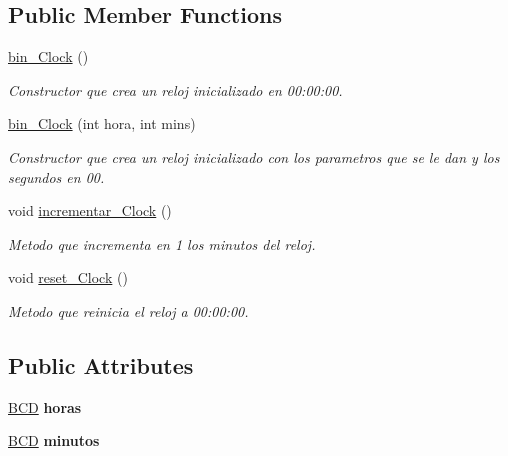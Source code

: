 \subsection*{Public Member Functions}
\begin{DoxyCompactItemize}
\item 
\mbox{\label{classbin__Clock_af4bb98f6018065cfda88fbc00d7c4c9c}} 
\hyperlink{classbin__Clock_af4bb98f6018065cfda88fbc00d7c4c9c}{bin\+\_\+\+Clock} ()
\begin{DoxyCompactList}\small\item\em Constructor que crea un reloj inicializado en 00\+:00\+:00. \end{DoxyCompactList}\item 
\hyperlink{classbin__Clock_a08180ca924ba3cf39b87fad8faafc5cc}{bin\+\_\+\+Clock} (int hora, int mins)
\begin{DoxyCompactList}\small\item\em Constructor que crea un reloj inicializado con los parametros que se le dan y los segundos en 00. \end{DoxyCompactList}\item 
\mbox{\label{classbin__Clock_a3a6acf30477a05b6bb743d5b2317100b}} 
void \hyperlink{classbin__Clock_a3a6acf30477a05b6bb743d5b2317100b}{incrementar\+\_\+\+Clock} ()
\begin{DoxyCompactList}\small\item\em Metodo que incrementa en 1 los minutos del reloj. \end{DoxyCompactList}\item 
\mbox{\label{classbin__Clock_ad8d8de67aa7e8b6e55ccc2a8e2cb64b1}} 
void \hyperlink{classbin__Clock_ad8d8de67aa7e8b6e55ccc2a8e2cb64b1}{reset\+\_\+\+Clock} ()
\begin{DoxyCompactList}\small\item\em Metodo que reinicia el reloj a 00\+:00\+:00. \end{DoxyCompactList}\end{DoxyCompactItemize}
\subsection*{Public Attributes}
\begin{DoxyCompactItemize}
\item 
\mbox{\label{classbin__Clock_ae38c8d386ad53284942a97e7002f0131}} 
\hyperlink{classBCD}{B\+CD} {\bfseries horas}
\item 
\mbox{\label{classbin__Clock_a175417b7491035e0b201113d37ca55dc}} 
\hyperlink{classBCD}{B\+CD} {\bfseries minutos}
\end{DoxyCompactItemize}


